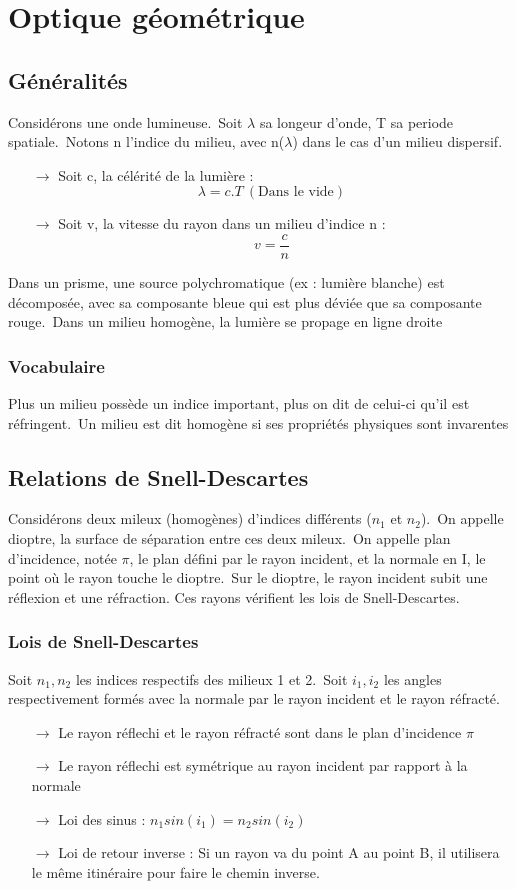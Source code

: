 
\chapter{Optique géométrique}
\section{Généralités}
Considérons une onde lumineuse.\
Soit $\lambda$ sa longeur d'onde, T sa periode spatiale.\
Notons n l'indice du milieu, avec n($\lambda$) dans le cas d'un milieu dispersif.
\begin{itemize}
 \item[$\rightarrow$] Soit c, la célérité de la lumière : $$\lambda = c.T~ (\mbox{Dans le vide})$$
 \item[$\rightarrow$] Soit v, la vitesse du rayon dans un milieu d'indice n : $$v = \dfrac{c}{n}$$
\end{itemize}
Dans un prisme, une source polychromatique (ex : lumière blanche) est décomposée, avec sa composante bleue qui est plus déviée que sa composante rouge.\
Dans un milieu homogène, la lumière se propage en ligne droite
\subsection{Vocabulaire}
Plus un milieu possède un indice important, plus on dit de celui-ci qu'il est réfringent.\
Un milieu est dit homogène si ses propriétés physiques sont invarentes
\section{Relations de Snell-Descartes}
\begin{de}
Considérons deux mileux (homogènes) d'indices différents ($n_1$ et $n_2$).\
On appelle dioptre, la surface de séparation entre ces deux mileux.\
On appelle plan d'incidence, notée $\pi$, le plan défini par le rayon incident, et la normale en I, le point où le rayon touche le dioptre.\
Sur le dioptre, le rayon incident subit une réflexion et une réfraction. Ces rayons vérifient les lois de Snell-Descartes.
\end{de}
\subsection{Lois de Snell-Descartes}
Soit $n_1,n_2$ les indices respectifs des milieux 1 et 2.\
Soit $i_1,i_2$ les angles respectivement formés avec la normale par le rayon incident et le rayon réfracté.
\begin{itemize}
 \item[$\rightarrow$] Le rayon réflechi et le rayon réfracté sont dans le plan d'incidence $\pi$
 \item[$\rightarrow$] Le rayon réflechi est symétrique au rayon incident par rapport à la normale
 \item[$\rightarrow$] Loi des sinus : $n_1sin(i_1)=n_2sin(i_2)$
\item[$\rightarrow$] Loi de retour inverse : Si un rayon va du point A au point B, il utilisera le même itinéraire pour faire le chemin inverse.
\end{itemize}

